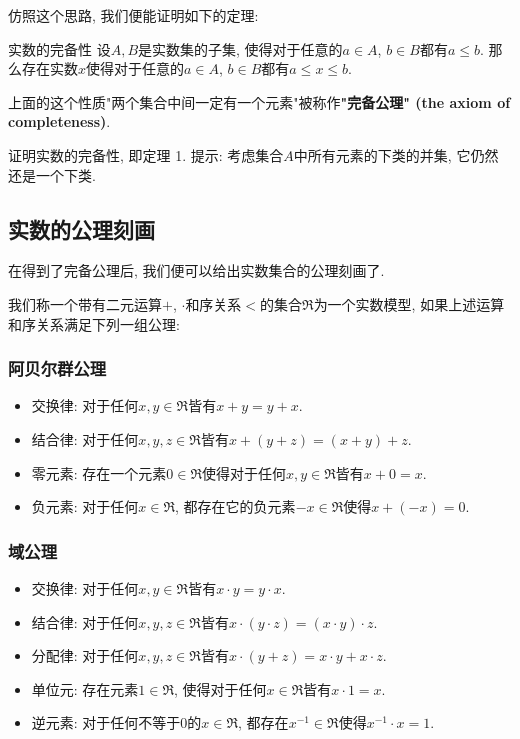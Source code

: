仿照这个思路, 我们便能证明如下的定理:

\begin{theorem}{实数的完备性}
设$A,B$是实数集的子集, 使得对于任意的$a\in A$, $b\in B$都有$a\leq b$. 那么存在实数$x$使得对于任意的$a\in A$, $b\in B$都有$a\leq x\leq b$.
\end{theorem}

上面的这个性质"两个集合中间一定有一个元素"被称作\textbf{"完备公理" (the axiom of completeness)}.

\begin{exercise}{}
证明实数的完备性, 即定理 1. 提示: 考虑集合$A$中所有元素的下类的并集, 它仍然还是一个下类.
\end{exercise}

\subsection{实数的公理刻画}

在得到了完备公理后, 我们便可以给出实数集合的公理刻画了. 

我们称一个带有二元运算$+$, $\cdot$和序关系$<$的集合$\mathfrak{R}$为一个实数模型, 如果上述运算和序关系满足下列一组公理:

\subsubsection{阿贝尔群公理}
\begin{itemize}
\item 交换律: 对于任何$x,y\in\mathfrak{R}$皆有$x+y=y+x$.
\item 结合律: 对于任何$x,y,z\in\mathfrak{R}$皆有$x+(y+z)=(x+y)+z$.
\item 零元素: 存在一个元素$0\in \mathfrak{R}$使得对于任何$x,y\in\mathfrak{R}$皆有$x+0=x$.
\item 负元素: 对于任何$x\in\mathfrak{R}$, 都存在它的负元素$-x\in\mathfrak{R}$使得$x+(-x)=0$.
\end{itemize}

\subsubsection{域公理}
\begin{itemize}
\item 交换律: 对于任何$x,y\in\mathfrak{R}$皆有$x\cdot y=y\cdot x$.
\item 结合律: 对于任何$x,y,z\in\mathfrak{R}$皆有$x\cdot (y\cdot z)=(x\cdot y)\cdot z$.
\item 分配律: 对于任何$x,y,z\in\mathfrak{R}$皆有$x\cdot (y+z)=x\cdot y+x\cdot z$.
\item 单位元: 存在元素$1\in\mathfrak{R}$, 使得对于任何$x\in\mathfrak{R}$皆有$x\cdot 1=x$.
\item 逆元素: 对于任何不等于0的$x\in\mathfrak{R}$, 都存在$x^{-1}\in\mathfrak{R}$使得$x^{-1}\cdot x=1$.
\end{itemize}

